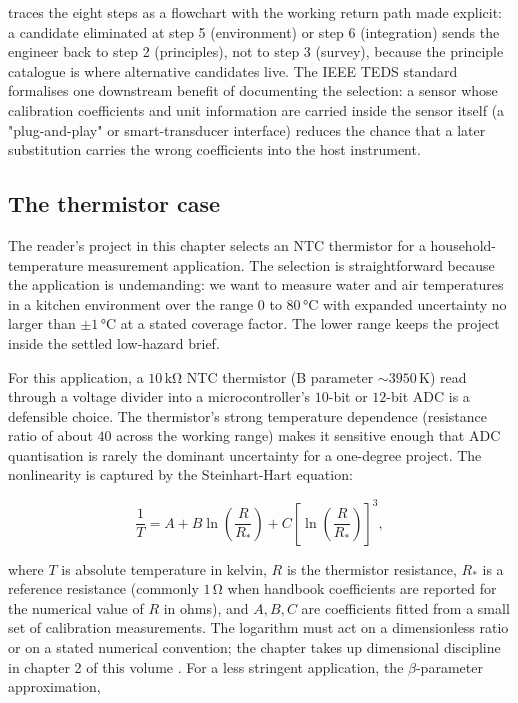  traces the eight steps as a
flowchart with the working return path made explicit: a candidate
eliminated at step 5 (environment) or step 6 (integration) sends the
engineer back to step 2 (principles), not to step 3
(survey), because the principle catalogue is where alternative
candidates live. The IEEE TEDS standard
\cite{std:ch05-ieee-1451-2-1997} formalises one downstream benefit of
documenting the selection: a sensor whose calibration coefficients
and unit information are carried inside the sensor itself (a
"plug-and-play" or smart-transducer interface) reduces the chance
that a later substitution carries the wrong coefficients into the
host instrument.



\subsection{The thermistor case}

The reader's project in this chapter selects an NTC thermistor for
a household-temperature measurement application. The selection is
straightforward because the application is undemanding: we want to
measure water and air temperatures in a kitchen environment over
the range $0$ to $80 \,\si{\degreeCelsius}$ with expanded
uncertainty no larger than $\pm 1 \,\si{\degreeCelsius}$ at a
stated coverage factor. The lower range keeps the project inside
the settled low-hazard brief.

For this application, a $10 \,\si{\kilo\ohm}$ NTC thermistor (B
parameter $\sim 3950 \,\si{\kelvin}$) read through a voltage divider
into a microcontroller's $10$-bit or $12$-bit ADC is a defensible
choice. The thermistor's strong temperature dependence (resistance
ratio of about $40$ across the working range) makes it sensitive
enough that ADC quantisation is rarely the dominant uncertainty for
a one-degree project. The nonlinearity is captured by the
Steinhart-Hart equation:

\[
\frac{1}{T} = A + B \ln\!\left(\frac{R}{R_{\ast}}\right) + C
\left[\ln\!\left(\frac{R}{R_{\ast}}\right)\right]^{3},
\]

where $T$ is absolute temperature in kelvin, $R$ is the thermistor
resistance, $R_{\ast}$ is a reference resistance (commonly
$1 \,\si{\ohm}$ when handbook coefficients are reported for the
numerical value of $R$ in ohms), and $A, B, C$ are coefficients
fitted from a small set of calibration measurements. The logarithm
must act on a dimensionless ratio or on a stated numerical
convention; the chapter takes up dimensional discipline in
chapter 2 of this volume \cite{text:fraden2016}. For a less
stringent application, the $\beta$-parameter approximation,

